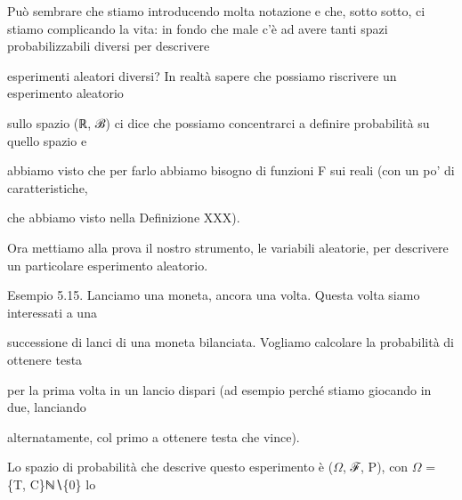 \documentclass[a4paper,portrait,12pt]{article}
\begin{document}
\begin{flushleft}
Pu\`{o} sembrare che stiamo introducendo molta notazione e che, sotto sotto, ci stiamo complicando la vita: in fondo che male c'\`{e} ad avere tanti spazi probabilizzabili diversi per descrivere
\end{flushleft}


\begin{flushleft}
esperimenti aleatori diversi? In realt\`{a} sapere che possiamo riscrivere un esperimento aleatorio
\end{flushleft}


\begin{flushleft}
sullo spazio (ℝ, ℬ) ci dice che possiamo concentrarci a definire probabilit\`{a} su quello spazio e
\end{flushleft}


\begin{flushleft}
abbiamo visto che per farlo abbiamo bisogno di funzioni F sui reali (con un po' di caratteristiche,
\end{flushleft}


\begin{flushleft}
che abbiamo visto nella Definizione XXX).
\end{flushleft}


\begin{flushleft}
Ora mettiamo alla prova il nostro strumento, le variabili aleatorie, per descrivere un particolare esperimento aleatorio.
\end{flushleft}


\begin{flushleft}
Esempio 5.15. Lanciamo una moneta, ancora una volta. Questa volta siamo interessati a una
\end{flushleft}


\begin{flushleft}
successione di lanci di una moneta bilanciata. Vogliamo calcolare la probabilit\`{a} di ottenere testa
\end{flushleft}


\begin{flushleft}
per la prima volta in un lancio dispari (ad esempio perch\'{e} stiamo giocando in due, lanciando
\end{flushleft}


\begin{flushleft}
alternatamente, col primo a ottenere testa che vince).
\end{flushleft}


\begin{flushleft}
Lo spazio di probabilit\`{a} che descrive questo esperimento \`{e} ($\Omega$, ℱ, P), con $\Omega$ = \{T, C\}ℕ∖\{0\} lo
\end{flushleft}
\end{document}
